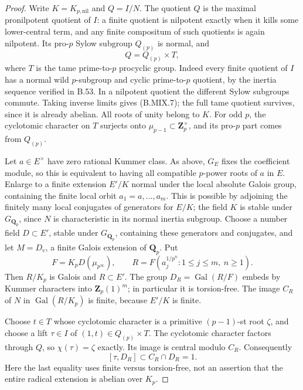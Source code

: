 \documentclass[11pt,a4paper]{article}
\newcommand{\Z}{\mathbf Z}
\newcommand{\Q}{\mathbf Q}
\begin{document}
\begin{proof}
Write \(K=K_{p,\mathrm{nil}}\) and \(Q=I/N\).
The quotient \(Q\) is the maximal pronilpotent quotient of
\(I\): a finite quotient is nilpotent exactly when it kills
some lower-central term, and any finite compositum of such
quotients is again nilpotent. Its pro-\(p\) Sylow subgroup
\(Q_{(p)}\) is normal, and
\[
                    Q=Q_{(p)}\times T,
                                                        \tag{B.MIX.7}
\]
where \(T\) is the tame prime-to-\(p\) procyclic group.
Indeed every finite quotient of \(I\) has a normal wild
\(p\)-subgroup and cyclic prime-to-\(p\) quotient, by the
inertia sequence verified in B.53. In a nilpotent quotient
the different Sylow subgroups commute. Taking inverse limits
gives (B.MIX.7); the full tame quotient survives, since it
is already abelian. All roots of unity belong to \(K\).
For odd \(p\), the cyclotomic character on \(T\) surjects
onto \(\mu_{p-1}\subset\Z_p^\times\), and its pro-\(p\)
part comes from \(Q_{(p)}\).

Let \(a\in E^\times\) have zero rational Kummer class.
As above, \(G_E\) fixes the coefficient module, so this is
equivalent to having all compatible \(p\)-power roots of
\(a\) in \(E\). Enlarge to a finite extension \(E'/K\)
normal under the local absolute Galois group, containing the
finite local orbit \(a_1=a,\ldots,a_m\). This is possible
by adjoining the finitely many local conjugates of generators
for \(E/K\); the field \(K\) is stable under \(G_{\Q_p}\),
since \(N\) is characteristic in its normal inertia subgroup.
Choose a number field \(D\subset E'\), stable under
\(G_{\Q_p}\), containing these generators and conjugates,
and let \(M=D_v\), a finite Galois extension of \(\Q_p\).
Put
\[
 F=K_pD(\mu_{p^\infty}),\qquad
 R=F(a_j^{1/p^n}:1\leq j\leq m,\ n\geq1).
\]
Then \(R/K_p\) is Galois and \(R\subset E'\).
The group \(D_R=\operatorname{Gal}(R/F)\) embeds by
Kummer characters into \(\Z_p(1)^m\); in particular it is
torsion-free. The image \(C_R\) of \(N\) in
\(\operatorname{Gal}(R/K_p)\) is finite, because
\(E'/K\) is finite.

Choose \(t\in T\) whose cyclotomic character is a primitive
\((p-1)\)-st root \(\zeta\), and choose a lift
\(\tau\in I\) of \((1,t)\in Q_{(p)}\times T\).
The cyclotomic character factors through \(Q\), so
\(\chi(\tau)=\zeta\) exactly. Its image is central modulo
\(C_R\). Consequently
\[
             [\tau,D_R]\subset C_R\cap D_R=1.           \tag{B.MIX.8}
\]
Here the last equality uses finite versus torsion-free, not
an assertion that the entire radical extension is abelian
over \(K_p\).


\end{proof}
\end{document}
